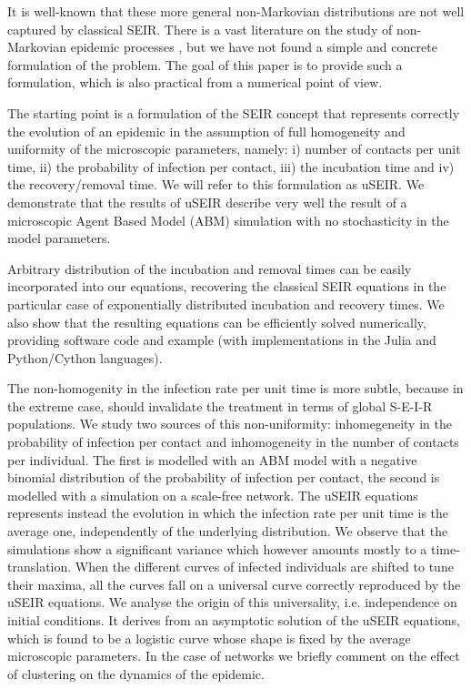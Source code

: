 \documentclass[a4paper,oneside,11pt]{article}
\begin{document}
It is well-known that these more general non-Markovian distributions are not well captured by classical SEIR. There is a vast literature on the study of non-Markovian epidemic processes \cite{}, but we have not found  a simple and concrete formulation of the problem. The goal of this paper is to provide such a formulation, which is also practical from a numerical point of view.  


The starting point is a formulation of the SEIR concept that   
represents correctly the evolution of an epidemic in the assumption of full homogeneity and uniformity of the microscopic parameters, namely: i) number of contacts per unit time, ii) the probability of infection per contact, iii) the incubation time and iv) the recovery/removal time. We will refer to this formulation as uSEIR. We demonstrate that the results of uSEIR describe very well the result of a microscopic Agent Based Model (ABM) simulation with no stochasticity in the model parameters.

Arbitrary distribution of the incubation and removal times can be easily  incorporated into our equations, recovering the classical SEIR equations in the particular case of exponentially distributed incubation and recovery times. We also show that the resulting equations can be efficiently solved numerically, providing software code and example (with implementations in the Julia and Python/Cython languages). 

The non-homogenity in the infection rate per unit time is more subtle, because in the extreme case, should invalidate the treatment in terms of global S-E-I-R populations. We study two sources of this non-uniformity: inhomegeneity in the probability of infection per contact and inhomogeneity in the number of contacts per individual. The first is modelled with an ABM model with a negative binomial distribution of the probability of infection per contact, the second is modelled with a simulation on a scale-free network. The uSEIR equations represents instead the evolution in which the infection rate per unit time is the average one, independently of the underlying distribution. We observe that the simulations show a significant variance which however amounts mostly to a time-translation. When the different curves of infected individuals are shifted to tune their maxima, all the curves fall on a universal curve correctly reproduced by the uSEIR equations. We analyse the origin of this universality, i.e. independence on initial conditions. It derives from an asymptotic solution of the uSEIR equations, which is found to be a logistic curve whose shape is fixed by the average microscopic parameters. In the case of networks we briefly comment on the effect of clustering on the dynamics of the epidemic. 
\end{document}
